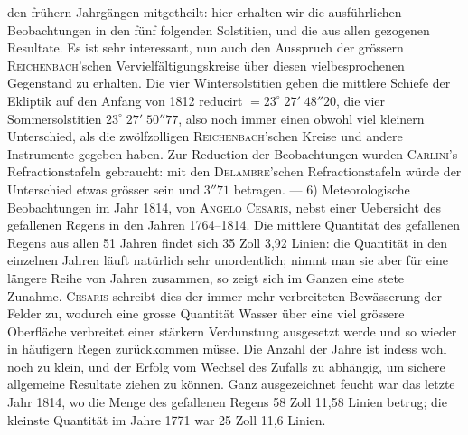 den frühern Jahrgängen mitgetheilt: hier erhalten wir die ausführlichen Beobachtungen in den fünf folgenden Solstitien, und die aus allen gezogenen Resultate. Es ist sehr interessant, nun auch den Ausspruch der grössern \textsc{Reichenbach}'schen Vervielfältigungskreise über diesen vielbesprochenen Gegenstand zu erhalten. Die vier Wintersolstitien geben die mittlere Schiefe der Ekliptik auf den Anfang von 1812 reducirt $=23^\circ\;27'\;48''20$, die vier Sommersolstitien $23^\circ\;27'\;50''77$, also noch immer einen obwohl viel kleinern Unterschied, als die zwölfzolligen \textsc{Reichenbach}'schen Kreise und andere Instrumente gegeben haben. Zur Reduction der Beobachtungen wurden \textsc{Carlini}'s Refractionstafeln gebraucht: mit den \textsc{Delambre}'schen Refractionstafeln würde der Unterschied etwas grösser sein und $3''71$ betragen. --- 6) Meteorologische Beobachtungen im Jahr 1814, von \textsc{Angelo Cesaris}, nebst einer Uebersicht des gefallenen Regens in den Jahren 1764--1814. Die mittlere Quantität des gefallenen Regens aus allen 51 Jahren findet sich 35 Zoll 3,92 Linien: die Quantität in den einzelnen Jahren läuft natürlich sehr unordentlich; nimmt man sie aber für eine längere Reihe von Jahren zusammen, so zeigt sich im Ganzen eine stete Zunahme. \textsc{Cesaris} schreibt dies der immer mehr verbreiteten Bewässerung der Felder zu, wodurch eine grosse Quantität Wasser über eine viel grössere Oberfläche verbreitet einer stärkern Verdunstung ausgesetzt werde und so wieder in häufigern Regen zurückkommen müsse. Die Anzahl der Jahre ist indess wohl noch zu klein, und der Erfolg vom Wechsel des Zufalls zu abhängig, um sichere allgemeine Resultate ziehen zu können. Ganz ausgezeichnet feucht war das letzte Jahr 1814, wo die Menge des gefallenen Regens 58 Zoll 11,58 Linien betrug; die kleinste Quantität im Jahre 1771 war 25 Zoll 11,6 Linien.
